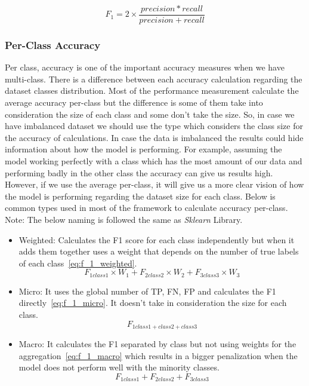 \begin{equation}\label{eq:f_1}
F_1= 2 \times \frac{precision*recall}{precision+recall}
\end{equation}%
  
\subsubsection{Per-Class Accuracy}

Per class, accuracy is one of the important accuracy measures when we have multi-class. There is a difference between each accuracy calculation regarding the dataset classes distribution. Most of the performance measurement calculate the average accuracy per-class but the difference is some of them take into consideration the size of each class and some don’t take the size. So, in case we have imbalanced dataset we should use the type which considers the class size for the accuracy of calculations. In case the data is imbalanced the results could hide information about how the model is performing. For example, assuming the model working perfectly with a class which has the most amount of our data and performing badly in the other class the accuracy can give us results high. However, if we use the average per-class, it will give us a more clear vision of how the model is performing regarding the dataset size for each class. Below is common types used in most of the framework to calculate accuracy per-class. Note: The below naming is followed the same as \textit{Sklearn} Library.

\begin{itemize}
  \item Weighted: Calculates the F1 score for each class independently but when it adds them together uses a weight that depends on the number of true labels of each class~\eqref{eq:f_1_weighted}.
\begin{equation}\label{eq:f_1_weighted}
F_{1 class1}\times W_1 + F_{2 class2}\times W_2 + F_{3 class3}\times W_3
\end{equation}%

  \item Micro: It uses the global number of TP, FN, FP and calculates the F1 directly~\eqref{eq:f_1_micro}. It doesn't take in consideration the size for each class.
  \begin{equation}\label{eq:f_1_micro}
F_{1 class1+class2+class3}
\end{equation}%
  \item Macro: It calculates the F1 separated by class but not using weights for the aggregation~\eqref{eq:f_1_macro}  which results in a bigger penalization when the model does not perform well with the minority classes.
\begin{equation}\label{eq:f_1_macro}
F_{1 class1} + F_{2 class2} + F_{3 class3}
\end{equation}%
  \end{itemize}




